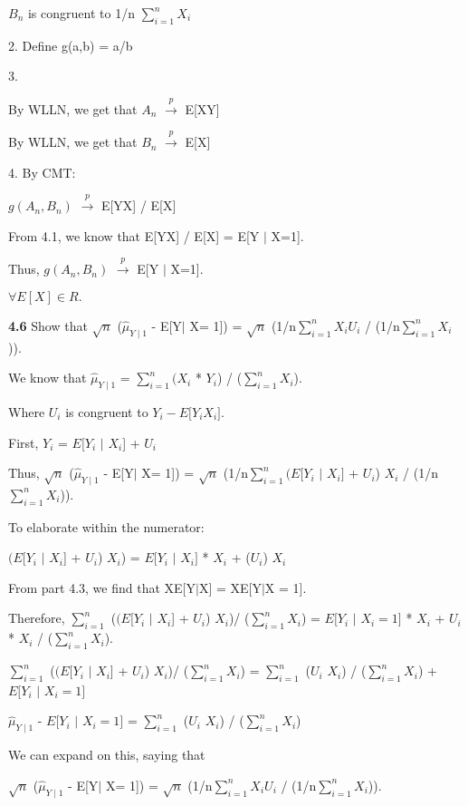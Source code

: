 $B_{n}$ is congruent to 1/n $\sum^n_{i=1} X_{i}$

2. Define g(a,b) = a/b

3. 

By WLLN, we get that $A_{n}$ $\xrightarrow{p}$ E[XY]

By WLLN, we get that $B_{n}$ $\xrightarrow{p}$ E[X]

4. By CMT:

$g(A_{n}, B_{n})$ $\xrightarrow{p}$ E[YX] / E[X] 

From 4.1, we know that E[YX] / E[X] = E[Y $\mid$ X=1].

Thus, $g(A_{n}, B_{n})$ $\xrightarrow{p}$ E[Y $\mid$ X=1].

$\forall E[X] \in R.$

\textbf{4.6} Show that $\sqrt{n}$ ($\hat{\mu}_{Y\mid1}$ - E[Y$\mid$ X= 1]) = $\sqrt{n}$ (1/n$\sum^n_{i=1} X_{i}U_{i}$ / (1/n$\sum^n_{i=1} X_{i}$)).

We know that 
$\hat{\mu}_{Y\mid1}$ = $\sum^n_{i=1} (X_{i}$ * $Y_{i}$) / ($\sum^n_{i=1} X_{i}$).

Where $U_{i}$ is congruent to $Y_{i} - E[Y_{i} $\mid$ X_{i}]$.

First, 
$Y_{i}$ = $E[Y_{i}$ $\mid$ $X_{i}$] + $U_{i}$

Thus,
$\sqrt{n}$ ($\hat{\mu}_{Y\mid1}$ - E[Y$\mid$ X= 1]) = $\sqrt{n}$ (1/n$\sum^n_{i=1} (E[Y_{i} $ $\mid$ $X_{i}]$ + $U_{i}$) $X_{i}$ / (1/n$\sum^n_{i=1} X_{i}$)).

To elaborate within the numerator:

$(E[Y_{i}$ $\mid$ $X_{i}$] + $U_{i}$) $X_{i}$) =  $E[Y_{i} $ $\mid$ $X_{i}]$ * $X_{i}$ + ($U_{i}$) $X_{i}$ 

From part 4.3, we find that XE[Y$\mid$X] = XE[Y$\mid$X = 1].

Therefore, $\sum^n_{i=1}$ ($(E[Y_{i}$ $\mid$ $X_{i}$] + $U_{i}$) $X_{i}$)/ ($\sum^n_{i=1} X_{i}$) =  $E[Y_{i}$ $\mid$ $X_{i} = 1]$ * $X_{i}$ + $U_{i}$ * $X_{i}$ / ($\sum^n_{i=1} X_{i}$). 

$\sum^n_{i=1}$ ($(E[Y_{i}$ $\mid$ $X_{i}$] + $U_{i}$) $X_{i}$)/ ($\sum^n_{i=1} X_{i}$) = $\sum^n_{i=1}$ ($U_{i}$ $X_{i}$) / ($\sum^n_{i=1} X_{i}$) + $E[Y_{i}$ $\mid$ $X_{i} = 1]$  

$\hat{\mu}_{Y\mid1}$ - $E[Y_{i}$ $\mid$ $X_{i} = 1]$ = $\sum^n_{i=1}$ ($U_{i}$ $X_{i}$) / ($\sum^n_{i=1} X_{i}$)

We can expand on this, saying that 

$\sqrt{n}$ ($\hat{\mu}_{Y\mid1}$ - E[Y$\mid$ X= 1]) = $\sqrt{n}$ (1/n$\sum^n_{i=1} X_{i}U_{i}$ / (1/n$\sum^n_{i=1} X_{i}$)).

